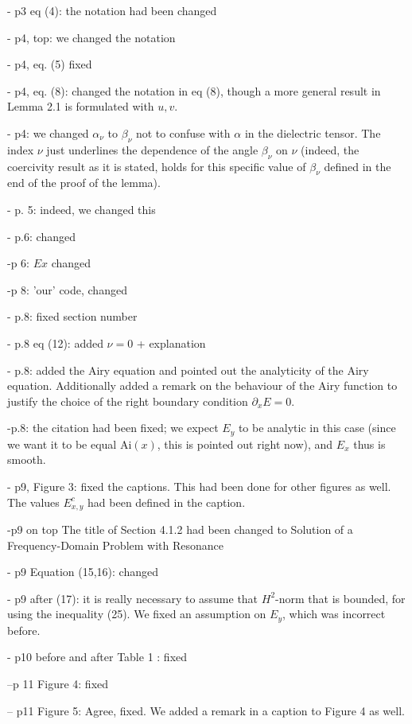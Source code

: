 \documentclass[a4paper,10pt]{article}
\begin{document}
- p3 eq (4): the notation had been changed
  
- p4, top: we changed the notation  

- p4, eq. (5) fixed

- p4, eq. (8): changed the notation in eq (8), though a more general result in Lemma 2.1 is formulated with $u,v$. 

- p4: we changed $\alpha_{\nu}$ to $\beta_{\nu}$ not to confuse with $\alpha$ in the dielectric tensor. The index $\nu$ 
just underlines the dependence of the angle $\beta_{\nu}$ on $\nu$ (indeed, the coercivity result as it is stated, holds for this specific value of $\beta_{\nu}$ defined 
in the end of the proof of the lemma).

- p. 5: indeed, we changed this 

- p.6:  changed

-p 6: $Ex$ changed

-p 8: 'our' code, changed

 - p.8: fixed section number
 
 - p.8 eq (12): added $\nu=0$ + explanation
 
 - p.8: added the Airy equation and pointed out the analyticity of the Airy equation. Additionally added a remark on the behaviour of the Airy function to justify the choice of the right boundary 
 condition $\partial_x E=0$. 
 
 -p.8: the citation had been fixed; we expect $E_y$ to be analytic in this case (since we want it to be equal $\mathrm{Ai}(x)$, this is pointed out right now), 
 and $E_x$ thus is smooth.
 
 -  p9, Figure 3: fixed the captions. This had been done for other figures as well. The values $E^{c}_{x,y}$ had been defined in the caption.
 
 -p9 on top
  The title of Section 4.1.2 had been changed to Solution of a Frequency-Domain Problem with Resonance
  
 - p9 Equation (15,16): changed  

 - p9 after (17): it is really necessary to assume that $H^2$-norm that is bounded, for using the inequality (25). 
 We fixed an assumption on $E_y$, which was incorrect before.


  
 - p10 before and after Table 1 : fixed
 
 --p 11 Figure 4: fixed
 
 -- p11 Figure 5:
Agree, fixed. We added a remark in a caption to Figure 4 as well.
\end{document}
